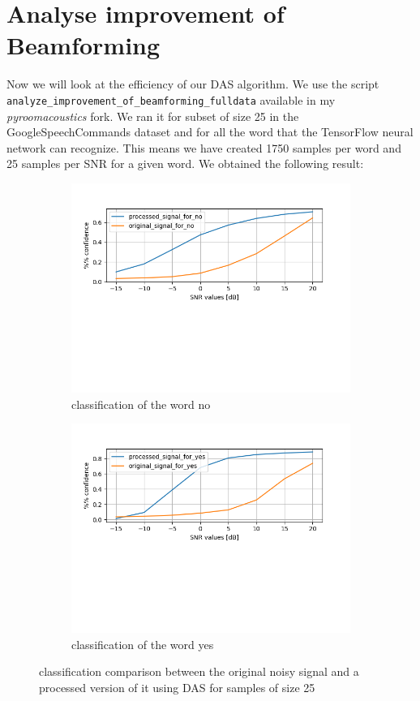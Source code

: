 \documentclass[11pt,a4paper,titlepage]{report}
\begin{document}
\section{Analyse improvement of Beamforming}
\hspace*{0.6cm}
Now we will look at the efficiency of our DAS algorithm. We use the script \texttt{analyze\_improvement\_of\_beamforming\_fulldata} available in my \textit{pyroomacoustics} fork. We ran it for subset of size 25 in the GoogleSpeechCommands dataset and for all the word that the TensorFlow neural network can recognize. This means we have created 1750 samples per word and 25 samples per SNR for a given word. We obtained the following result:\\
\begin{figure}[h!]
	\centering
	\begin{subfigure}{.5\textwidth}
		\centering
		\includegraphics[width=0.9\linewidth]{rapport_beamforming_no.png}
		\caption{classification of the word no}
		\label{fig:sub4}
	\end{subfigure}%
	\begin{subfigure}{.5\textwidth}
		\centering
		\includegraphics[width=0.9\linewidth]{rapport_beamforming_yes.png}
		\caption{classification of the word yes}
		\label{fig:sub6}
	\end{subfigure}
	
	\caption{classification comparison between the original noisy signal and a processed version of it using DAS for samples of size 25}
	\label{fig:rapport15}
\end{figure}\\
\end{document}
